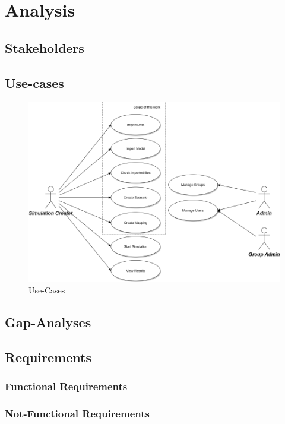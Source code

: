 \chapter{Analysis}
\section{Stakeholders}
\section{Use-cases}
\begin{figure}[H]
	\centering\includegraphics[width=1\textwidth]{res/Use-Cases}
	\caption{Use-Cases}
	\label{fig:use-cases}
\end{figure}
\section{Gap-Analyses}
\section{Requirements}
\subsection{Functional Requirements}
\subsection{Not-Functional Requirements
}